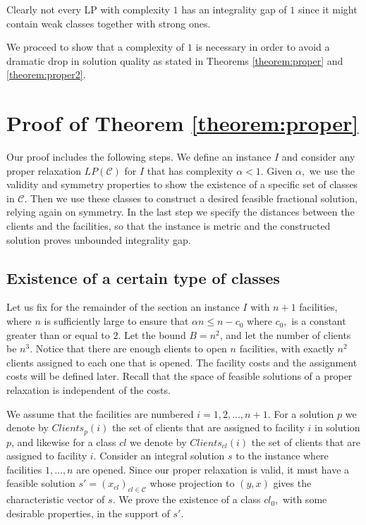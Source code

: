 \documentclass[11pt]{article}\usepackage{amsmath}
\begin{document}
Clearly not every LP with complexity $1$ has an integrality gap of $1$
since it might contain weak classes together with  strong
ones.


We proceed  to show that a complexity of $1$  is necessary 
in order to avoid a dramatic drop in solution quality as stated in 
Theorems \ref{theorem:proper} and \ref{theorem:proper2}.







\section{Proof of Theorem \ref{theorem:proper}}
\label{sec:proof_theorem_p1}

Our proof includes the following steps. We define an instance $I$ 
and consider any proper relaxation $LP(\mathcal{C})$ for $I$ that has complexity
$\alpha <1.$ 
Given $\alpha,$ we use   the validity  and symmetry properties to show the existence of
a specific set of classes in $\mathcal{C}$. Then we use these classes to construct a
desired feasible fractional solution, relying again on symmetry. 
In the last step  we specify  the distances between the clients and  the facilities, so
that the instance is metric and the constructed solution proves unbounded integrality
gap.



\subsection{Existence of a certain type of classes}

Let us fix for the remainder of the section 
an instance $I$ with $n+1$ facilities, where $n$ is
sufficiently large to ensure  that $\alpha n \leq n - c_0$  where
$c_0,$  is a
constant greater than or equal to  $2$. Let the bound $B=n^2$, and let
the number of  clients be $n^3$. Notice that  there are enough clients
to open $n$ facilities, with  exactly $n^2$ clients assigned  to each
one that is opened. The  facility costs  and the assignment  costs will  be defined
later.  Recall  that the  space  of  feasible  solutions of  a  proper
relaxation is independent of the costs.

 We  assume that  the  facilities are  numbered
$i=1,2,...,n+1$. 
For a solution $p$ we  denote by $Clients_p(i)$
the set  of clients  that are assigned  to facility $i$  in solution
$p$, and  likewise for a  class $cl$ we denote  by $Clients_{cl}(i)$
the set of clients that are assigned to facility $i$.  
Consider  an  integral  solution  $s$  to  the  instance  where 
facilities $1,...,n$  are opened. 
Since our proper  relaxation is valid, it must have   a feasible 
solution $s'=(x_{cl})_{cl \in \mathcal{C}}$  whose projection to $(y,x)$ gives the characteristic
vector of $s$.  We prove the existence of a  class $cl_0,$ with some desirable
properties, in the support of $s'.$ 
\end{document}
